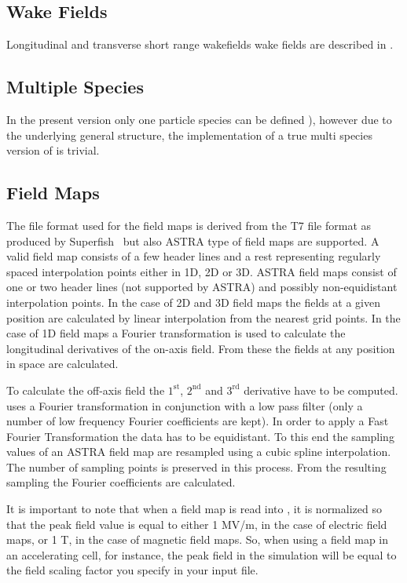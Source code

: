 \subsection{Wake Fields}
Longitudinal and transverse short range wakefields wake fields are described in .

\subsection{Multiple Species}
In the present version only one particle species can be defined ), however
due to the underlying general structure, the implementation of a true multi species version of \opal is
trivial.

\subsection{Field Maps}
\label{sec:fieldmaps}
The file format used for the field maps is derived from the T7 file format as produced by Superfish~\cite{superfish} but also ASTRA type of field maps are supported. A valid field map consists of a few header lines and a rest representing regularly spaced interpolation points either in 1D, 2D or 3D. ASTRA field maps consist of one or two header lines (not supported by ASTRA) and possibly non-equidistant interpolation points. In the case of 2D and 3D field maps the fields at a given position are calculated by linear interpolation from the nearest grid points. In the case of 1D field maps a Fourier transformation is used to calculate the longitudinal derivatives of the on-axis field. From these the fields at any position in space are calculated.

To calculate the off-axis field the $1^{\mathrm{st}}$, $2^{\mathrm{nd}}$ and $3^{\mathrm{rd}}$ derivative have to be computed. \opalt uses a Fourier transformation in conjunction with a low pass filter (only a number of low frequency Fourier coefficients are kept). In order to apply a Fast Fourier Transformation the data has to be equidistant. To this end the sampling values of an ASTRA field map are resampled using a cubic spline interpolation. The number of sampling points is preserved in this process. From the resulting sampling the Fourier coefficients are calculated.

It is important to note that when a field map is read into \opalt, it is normalized so that the peak field value is equal to either 1 MV/m,
in the case of electric field maps, or 1 T, in the case of magnetic field maps. So, when using a field map in an accelerating cell, for instance,
the peak field in the simulation will be equal to the field scaling factor you specify in your input file.

